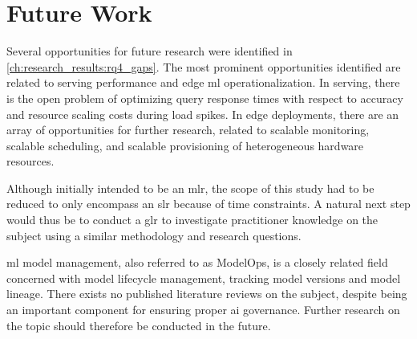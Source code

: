 \chapter{Future Work}
\label{ch:future_work}
Several opportunities for future research were identified in \cref{ch:research_results:rq4_gaps}.
The most prominent opportunities identified are related to serving performance and edge \acrshort{ml} operationalization.
In serving, there is the open problem of optimizing query response times with respect to accuracy and resource scaling costs during load spikes.
In edge deployments, there are an array of opportunities for further research, related to scalable monitoring, scalable scheduling, and scalable provisioning of heterogeneous hardware resources.

Although initially intended to be an \acrshort{mlr}, the scope of this study had to be reduced to only encompass an \acrshort{slr} because of time constraints.
A natural next step would thus be to conduct a \acrshort{glr} to investigate practitioner knowledge on the subject using a similar methodology and research questions.

\acrshort{ml} model management, also referred to as ModelOps, is a closely related field concerned with model lifecycle management, tracking model versions and model lineage.
There exists no published literature reviews on the subject, despite being an important component for ensuring proper \acrshort{ai} governance.
Further research on the topic should therefore be conducted in the future.